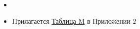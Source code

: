 \begin{itemize}
    \item {}

    \item Прилагается \hyperlink{tableM}{Таблица M} в Приложении 2
\end{itemize}